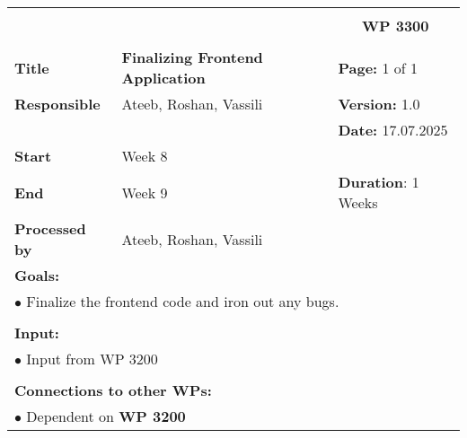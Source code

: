 \begin{table}[!h]
    \begin{center}
        \begin{tabular}{|p{}||p{}|p{}||p{}|}
            \hline
            \multicolumn{3}{|l||}{\textbf{}} & \multicolumn{1}{c|}{}\\
            \multicolumn{3}{|l||}{\textbf{}} & \multicolumn{1}{c|}{\textbf{WP 3300}}\\
            \multicolumn{3}{|l||}{\textbf{}} & \multicolumn{1}{c|}{}\\
            \hline\hline
            \textbf{Title} & \multicolumn{2}{p{.40\columnwidth}||}{\textbf{Finalizing Frontend Application}}
            & \textbf{Page:} 1 of 1\\
            \hline
            \textbf{Responsible} & \multicolumn{2}{l||}{Ateeb, Roshan, Vassili} & \textbf{Version:} 1.0\\
            \hline
            \multicolumn{3}{|l||}{} & \textbf{Date:}  17.07.2025 \\
            \hline\hline
            \textbf{Start} & \multicolumn{2}{l||}{Week 8} & \\
            \hline
            \textbf{End} & \multicolumn{2}{l||}{Week 9} & \textbf{Duration}: 1 Weeks\\
            \hline\hline
            \textbf{Processed by} & \multicolumn{3}{l|}{Ateeb, Roshan, Vassili}\\
            \hline\hline
            \multicolumn{4}{|p{.95\columnwidth}|}{\textbf{Goals:}}\\
            \multicolumn{4}{|p{.95\columnwidth}|}{$\bullet$ Finalize the frontend code and iron out any bugs.}\\
            \multicolumn{4}{|p{.95\columnwidth}|}{}\\
            \multicolumn{4}{|p{.95\columnwidth}|}{\textbf{Input:}}\\
            \multicolumn{4}{|p{.95\columnwidth}|}{$\bullet$ Input from WP 3200}\\
            \multicolumn{4}{|p{.95\columnwidth}|}{}\\
            \multicolumn{4}{|p{.95\columnwidth}|}{\textbf{Connections to other WPs:}}\\
                        \multicolumn{4}{|p{.95\columnwidth}|}{$\bullet$ Dependent on \textbf{WP 3200}}\\


\end{tabular}
\end{center}
\end{table}
